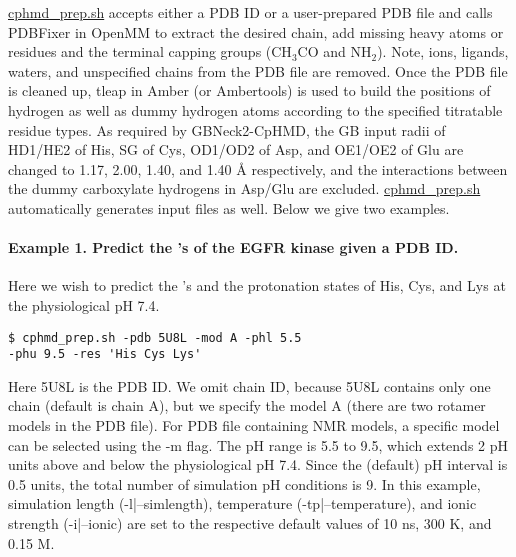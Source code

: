 \href{https://gitlab.com/shenlab-amber-cphmd/cphmd-prep/-/tree/master/cphmd_tools/cphmd_prep.sh}{cphmd\_prep.sh}
accepts either a PDB ID
or a user-prepared PDB file and calls PDBFixer in
OpenMM\cite{Eastman_Pande_2017_PLoSComput.Biol.}
to extract the desired chain, add missing heavy atoms 
or residues and the terminal capping groups 
(CH$_3$CO and NH$_2$).
Note, ions, ligands, waters, 
and unspecified chains from the PDB file are removed.
Once the PDB file is cleaned up, tleap in Amber (or Ambertools) is used to build the positions of hydrogen as well as dummy hydrogen atoms according to the specified titratable residue types.
As required by GBNeck2-CpHMD, \cite{Huang_Shen_2018_J.Chem.Inf.Model.,Harris_Shen_2019_J.Chem.Inf.Model.} 
the GB input radii of HD1/HE2 of His, SG of Cys, OD1/OD2 of Asp, and OE1/OE2 of Glu are changed to 1.17, 2.00, 1.40, and 1.40 {\AA} respectively, and the interactions between the dummy carboxylate hydrogens in Asp/Glu are excluded. 
\href{https://gitlab.com/shenlab-amber-cphmd/cphmd-prep/-/tree/master/cphmd_tools}{cphmd\_prep.sh}
automatically generates input files as well.
Below we give two examples.

\paragraph{Example 1. Predict the {\pka's} of the EGFR kinase given a PDB ID.}
Here we wish to predict 
the {\pka's} and 
the protonation states
of His, Cys, and Lys at the physiological pH 7.4.
%
\begin{lstlisting}
$ cphmd_prep.sh -pdb 5U8L -mod A -phl 5.5 
-phu 9.5 -res 'His Cys Lys'
\end{lstlisting}
%
Here 5U8L is the PDB ID.
We omit chain ID, because 5U8L contains only one chain (default is chain A), but we specify the model A (there are two rotamer models in the PDB file). 
For PDB file containing NMR models, a specific model can be selected using the -m flag. 
The pH range is 5.5 to 9.5, which extends 2 pH
units above and below the physiological pH 7.4.
Since the (default) pH interval is 0.5 units, the total number of simulation pH conditions is 9. 
In this example, simulation length (-l|--simlength), temperature (-tp|--temperature), and ionic strength (-i|--ionic) are set to the respective default values of 10 ns, 300 K, and 0.15 M. 

